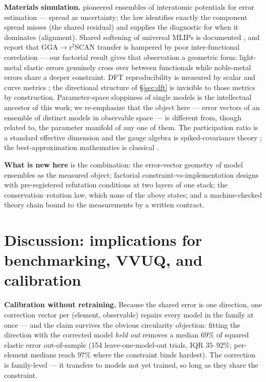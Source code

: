 \documentclass[11pt]{article}
\theoremstyle{remark}
\begin{document}
\textbf{Materials simulation.} \citep{frederiksen2004} pioneered ensembles of
interatomic potentials for error estimation --- spread as uncertainty; the law
identifies exactly the component spread misses (the shared residual) and
supplies the diagnostic for when it dominates (alignment). Shared softening of
universal MLIPs is documented \citep{deng2025softening,yu2024}, and
\citep{huang2025} report that GGA$\to$r$^2$SCAN transfer is hampered by poor
inter-functional correlation --- our factorial result gives that observation a
geometric form: light-metal elastic errors genuinely cross over between
functionals while noble-metal errors share a deeper constraint.
DFT reproducibility is measured by scalar and curve metrics
\citep{lejaeghere2016,bosoni2024}; the directional structure of
\S\ref{sec:dft} is invisible to those metrics by construction. Parameter-space
sloppiness of single models \citep{transtrum2011,machta2013,quinn2023,kurniawan2022}
is the intellectual ancestor of this work; we re-emphasize that the object here
--- error vectors of an ensemble of distinct models in observable space --- is
different from, though related to, the parameter manifold of any one of them.
The participation ratio is a standard effective dimension \citep{gao2015} and
the gauge algebra is spiked-covariance theory \citep{johnstone2001}; the
best-approximation mathematics is classical \citep{deutsch2001,kinderlehrer1980}.

\textbf{What is new here} is the combination: the error-vector geometry of
model ensembles as the measured object; factorial constraint-vs-implementation
designs with pre-registered refutation conditions at two layers of one stack;
the conservation--rotation law, which none of the above states; and a
machine-checked theory chain bound to the measurements by a written contract.

\section{Discussion: implications for benchmarking, VVUQ, and calibration}
\label{sec:implications}

\textbf{Calibration without retraining.} Because the shared error is one
direction, one correction vector per (element, observable) repairs every model
in the family at once --- and the claim survives the obvious circularity
objection: fitting the direction with the corrected model \emph{held out}
removes a median $69\%$ of squared elastic error out-of-sample (154
leave-one-model-out trials, IQR $35$--$92\%$; per-element medians reach
$97\%$ where the constraint binds hardest). The correction is family-level
--- it transfers to models not yet trained, so long as they share the
constraint.
\end{document}
